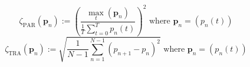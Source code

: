 \begin{equation}
	\zeta_\text{PAR}(\textbf{p}_n) := \left(\frac{\max_t(\textbf{p}_n)}{\frac{1}{T}\sum_{t=0}^{T}p_n(t)}\right)^2 \text{ where } \textbf{p}_n = (p_n(t))
	\label{ch3:equ:performance-metrics-par}
\end{equation}
\begin{equation}
	\zeta_\text{TRA}(\textbf{p}_n) := \sqrt{\frac{1}{N-1}\sum_{n=1}^{N-1}(p_{n+1}-p_n)^2} \text{ where } \textbf{p}_n = (p_n(t))
	\label{ch3:equ:performance-metrics-tra}
\end{equation}